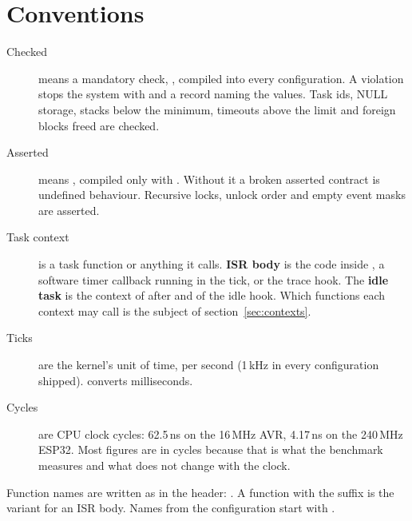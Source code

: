 \section{Conventions}

\begin{description}
\item[Checked] means a mandatory check, , compiled into every
  configuration. A violation stops the system with  and a
  record naming the values. Task ids, NULL storage, stacks below the minimum, timeouts
  above the limit and foreign blocks freed are checked.
\item[Asserted] means , compiled only with .
  Without it a broken asserted contract is undefined behaviour. Recursive locks, unlock
  order and empty event masks are asserted.
\item[Task context] is a task function or anything it calls. \textbf{ISR body} is the
  code inside , a software timer callback running in the tick, or the
  trace hook. The \textbf{idle task} is the context of  after
   and of the idle hook. Which functions each context may call is
  the subject of section~\ref{sec:contexts}.
\item[Ticks] are the kernel's unit of time,  per second
  (1\,kHz in every configuration shipped).  converts milliseconds.
\item[Cycles] are CPU clock cycles: 62.5\,ns on the 16\,MHz AVR, 4.17\,ns on the
  240\,MHz ESP32. Most figures are in cycles because that is what the benchmark measures
  and what does not change with the clock.
\end{description}

Function names are written as in the header: . A function with the
suffix  is the variant for an ISR body. Names from the configuration start
with .
